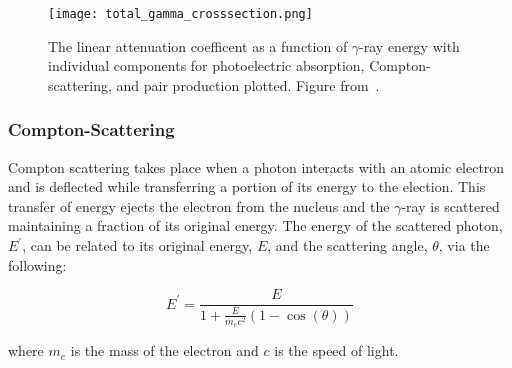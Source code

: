 \documentclass[cnatzke_thesis_proposal.tex]{subfiles}
\begin{document}
\begin{figure}[htbp]
    \centering
    \texttt{[image: total\_gamma\_crosssection.png]}
    \caption{The linear attenuation coefficent as a function of $\gamma$-ray energy with individual components for photoelectric absorption, Compton-scattering, and pair production plotted. Figure from~\cite{maclean_spectroscopy_2021}.}
    \label{fig:total_crosssection}
\end{figure}

\subsubsection{Compton-Scattering}
\label{sec:compton_scatter}

Compton scattering takes place when a photon interacts with an atomic electron and is deflected while transferring a portion of its energy to the election. 
This transfer of energy ejects the electron from the nucleus and the $\gamma$-ray is scattered maintaining a fraction of its original energy. 
The energy of the scattered photon, $E^{'}$, can be related to its original energy, $E$, and the scattering angle, $\theta$, via the following:

\begin{equation}
    E^{'} = \frac{E}{1 + \frac{E}{m_e c^2}(1 - \cos(\theta))}
\end{equation}

where $m_e$ is the mass of the electron and $c$ is the speed of light. 


\end{document}
